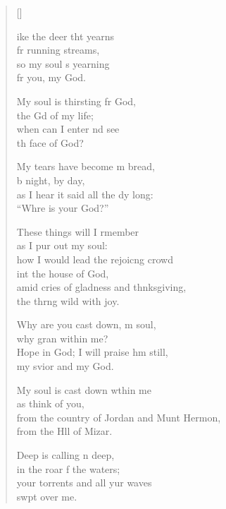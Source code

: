\settowidth{\versewidth}{from the country of Jordan and Mount Hermon, *}
\begin{verse}[\versewidth]
  \begin{patverse}
ike the deer tht yearns\Med\\
fr running streams,\\
so my soul \pointup{\i}s yearning\Med\\
fr you, my God.

My soul is thirsting fr God,\Med\\
the Gd of my life;\\
when can I enter nd see\Med\\
th face of God?

My tears have become m bread,\Med\\
b night, by day,\\
as I hear it said all the dy long:\Med\\
“Whre is your God?”

These things will I rmember\Med\\
as I pur out my soul:\\
how I would lead the rejoic\pointup{\i}ng crowd\Med\\
int the house of God,\\
amid cries of gladness and thnksgiving,\Med\\
the thrng wild with joy.

Why are you cast down, m soul,\Med\\
why gran within me?\\
Hope in God; I will praise h\pointup{\i}m still,\Med\\
my svior and my God.

My soul is cast down w\pointup{\i}thin me\Med\\
as  think of you,\\
from the country of Jordan and Munt Hermon,\Med\\
from the Hll of Mizar.

Deep is calling n deep,\Med\\
in the roar f the waters;\\
your torrents and all yur waves\Med\\
swpt over me.


\end{patverse}
\end{verse}
